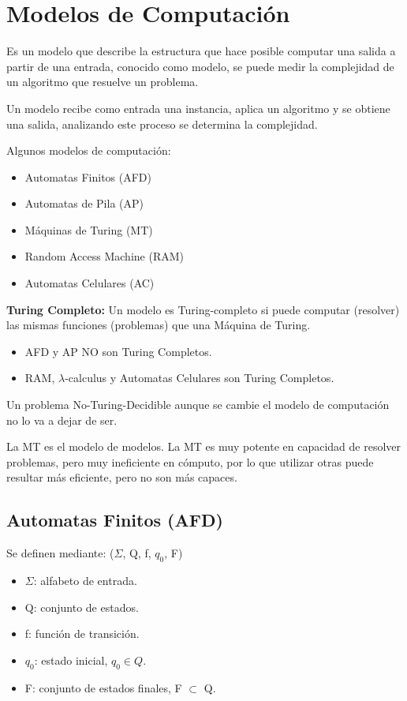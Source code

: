 \chapter{Modelos de Computación}\label{ch:modelos-de-computación}
Es un modelo que describe la estructura que hace posible computar una salida a partir de una entrada, conocido como modelo, se puede medir la complejidad de un algoritmo que resuelve un problema.

Un modelo recibe como entrada una instancia, aplica un algoritmo y se obtiene una salida, analizando este proceso se determina la complejidad.

Algunos modelos de computación:
\begin{itemize}
    \item Automatas Finitos (AFD)
    \item Automatas de Pila (AP)
    \item Máquinas de Turing (MT)
    \item Random Access Machine (RAM)
    \item Automatas Celulares (AC)
\end{itemize}

\textbf{Turing Completo:} Un modelo es Turing-completo si puede computar (resolver) las mismas funciones (problemas) que una Máquina de Turing.
\begin{itemize}
    \item AFD y AP NO son Turing Completos.
    \item RAM, $\lambda$-calculus y Automatas Celulares son Turing Completos.
\end{itemize}

Un problema No-Turing-Decidible aunque se cambie el modelo de computación no lo va a dejar de ser.

La MT es el modelo de modelos. La MT es muy potente en capacidad de resolver problemas, pero muy ineficiente en cómputo, por lo que utilizar otras puede resultar más eficiente, pero no son más capaces.

\section{Automatas Finitos (AFD)}
Se definen mediante: ($\Sigma$, Q, f, $q_0$, F)
\begin{itemize}
    \item $\Sigma$: alfabeto de entrada.
    \item Q: conjunto de estados.
    \item f: función de transición.
    \item $q_0$: estado inicial, $q_0 \in Q$.
    \item F: conjunto de estados finales, F $\subset$ Q.
\end{itemize}

